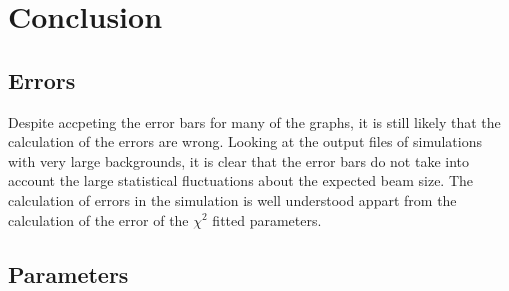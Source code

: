 
\section{Conclusion}
\label{sec:conclusion}



\subsection{Errors}
\label{sub:errors}

Despite accpeting the error bars for many of the graphs, it is still likely that
the calculation of the errors are wrong. Looking at the output files of
simulations with very large backgrounds, it is clear that the error bars do not
take into account the large statistical fluctuations about the expected beam
size. The calculation of errors in the simulation is well understood appart from
the calculation of the error of the \(\chi^2\) fitted parameters.

\subsection{Parameters}
\label{sub:parameters}



